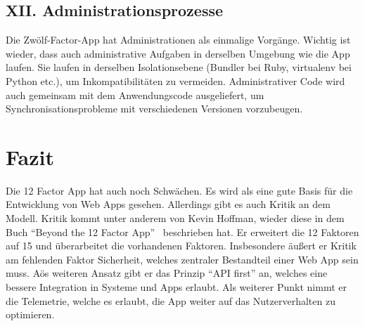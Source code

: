\documentclass[fleqn,10pt]{SelfArx} %
\begin{document}
\subsection{XII. Administrationsprozesse}
Die Zwölf-Factor-App hat Administrationen als einmalige Vorgänge. Wichtig ist wieder, dass auch administrative Aufgaben in derselben Umgebung wie die App laufen. Sie laufen in derselben Isolationsebene (Bundler bei Ruby, virtualenv bei Python etc.), um Inkompatibilitäten zu vermeiden. Administrativer Code wird auch gemeinsam mit dem Anwendungscode ausgeliefert, um Synchronisationsprobleme mit verschiedenen Versionen vorzubeugen.
\section{Fazit}
Die 12 Factor App hat auch noch Schwächen. Es wird als eine gute Basis für die Entwicklung von Web Apps gesehen. Allerdings gibt es auch Kritik an dem Modell. Kritik kommt unter anderem von Kevin Hoffman, wieder diese in dem Buch \enquote{Beyond the 12 Factor App}~\cite{beyond} beschrieben hat. Er erweitert die 12 Faktoren auf 15 und überarbeitet die vorhandenen Faktoren. Insbesondere äußert er Kritik am fehlenden Faktor Sicherheit, welches zentraler Bestandteil einer Web App sein muss. Aös weiteren Ansatz gibt er das Prinzip \enquote{API first} an, welches eine bessere Integration in Systeme und Apps erlaubt. Als weiterer Punkt nimmt er die Telemetrie, welche es erlaubt, die App weiter auf das Nutzerverhalten zu optimieren.




\printbibliography%
\end{document}
